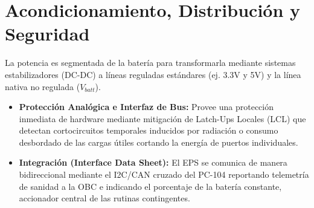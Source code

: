 \section{Acondicionamiento, Distribución y Seguridad}
La potencia es segmentada de la batería para transformarla mediante sistemas estabilizadores (DC-DC) a líneas reguladas estándares (ej. 3.3V y 5V) y la línea nativa no regulada ($V_{batt}$).
\begin{itemize}
    \item \textbf{Protección Analógica e Interfaz de Bus:} Provee una protección inmediata de hardware mediante mitigación de Latch-Ups Locales (LCL) que detectan cortocircuitos temporales inducidos por radiación o consumo desbordado de las cargas útiles cortando la energía de puertos individuales.
    \item \textbf{Integración (Interface Data Sheet):} El EPS se comunica de manera bidireccional mediante el I2C/CAN cruzado del PC-104 reportando telemetría de sanidad a la OBC e indicando el porcentaje de la batería constante, accionador central de las rutinas contingentes.
\end{itemize}
